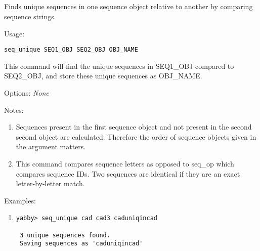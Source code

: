 

\subsection[seq\_unique]{  }



Finds unique sequences in one sequence object relative to another
by comparing sequence strings.


\begin{description}


\item{Usage:}

{\tt seq\_unique SEQ1\_OBJ SEQ2\_OBJ OBJ\_NAME}

This command will find the unique sequences in SEQ1\_OBJ compared
to SEQ2\_OBJ, and store these unique sequences as OBJ\_NAME.


\item{Options:} {\em None}


\item{Notes:}
\begin{enumerate}
\item Sequences present in the first sequence object and not present
 in the second second object are calculated. Therefore the order
 of sequence objects given in the argument matters.
\item This command compares sequence letters as opposed to seq\_op
 which compares sequence IDs. Two sequences are identical if they
 are an exact letter-by-letter match.
\end{enumerate}


\item{Examples:}
\begin{enumerate}

\item
\begin{verbatim}
yabby> seq_unique cad cad3 caduniqincad

 3 unique sequences found.
 Saving sequences as 'caduniqincad'

\end{verbatim}


\end{enumerate}
\end{description}
